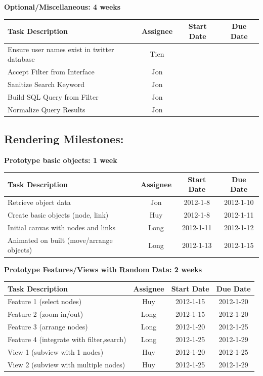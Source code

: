 \documentclass[12pt, letterpaper]{article}
\begin{document}
  \begin{center}
		{\bf Optional/Miscellaneous: 4 weeks}
    \begin{tabular}{| p{8.3cm} || c | c | c | }
      \hline
      Task Description & Assignee & Start Date & Due Date \\
      \hline
        Ensure user names exist in twitter database & Tien & & \\
	    Accept Filter from Interface & Jon & & \\
	    Sanitize Search Keyword & Jon & & \\
	    Build SQL Query from Filter & Jon & & \\
        Normalize Query Results & Jon & & \\
      \hline
    \end{tabular}
  \end{center}
  
\subsection{Rendering Milestones:}

  \begin{center}
		{\bf Prototype basic objects: 1 week}
    \begin{tabular}{| p{8.3cm} || c | c | c | }
      \hline
      Task Description & Assignee & Start Date & Due Date \\
      \hline
        Retrieve object data & Jon & 2012-1-8 & 2012-1-10 \\
	    Create basic objects (node, link)& Huy & 2012-1-8 & 2012-1-11 \\
		Initial canvas with nodes and links & Long & 2012-1-11 & 2012-1-12 \\
	    Animated on built (move/arrange objects) & Long & 2012-1-13 & 2012-1-15 \\
      \hline
    \end{tabular}
  \end{center}

\begin{center}
		{\bf Prototype Features/Views with Random Data: 2 weeks}
    \begin{tabular}{| p{8.3cm} || c | c | c | }
      \hline
      Task Description & Assignee & Start Date & Due Date \\
      \hline
	    Feature 1 (select nodes) & Huy & 2012-1-15 & 2012-1-20 \\
	    Feature 2 (zoom in/out)  & Long & 2012-1-15 & 2012-1-20 \\
	    Feature 3 (arrange nodes)  & Long & 2012-1-20 & 2012-1-25 \\
	    Feature 4 (integrate with filter,search)  & Long & 2012-1-25 & 2012-1-29 \\
            View 1 (subview with 1 nodes)  & Huy & 2012-1-20 & 2012-1-25 \\
	    View 2 (subview with multiple nodes)  & Huy & 2012-1-25 & 2012-1-29 \\
      \hline
    \end{tabular}
  \end{center}
\end{document}

